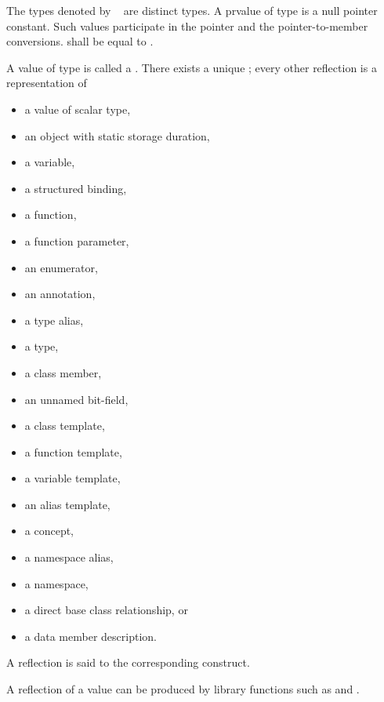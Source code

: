 \pnum
The types denoted by \cv~ are distinct types.
A prvalue of type  is a null pointer
constant. Such values participate in the pointer and the
pointer-to-member conversions.
 shall be equal to .

\pnum
A value of type  is called a .
There exists a unique ;
every other reflection is a representation of
\begin{itemize}
\item a value of scalar type,
\item an object with static storage duration,
\item a variable,
\item a structured binding,
\item a function,
\item a function parameter,
\item an enumerator,
\item an annotation,
\item a type alias,
\item a type,
\item a class member,
\item an unnamed bit-field,
\item a class template,
\item a function template,
\item a variable template,
\item an alias template,
\item a concept,
\item a namespace alias,
\item a namespace,
\item a direct base class relationship, or
\item a data member description.
\end{itemize}
A reflection is said to  the corresponding construct.
\begin{note}
A reflection of a value can be produced by library functions such as
 and .
\end{note}
